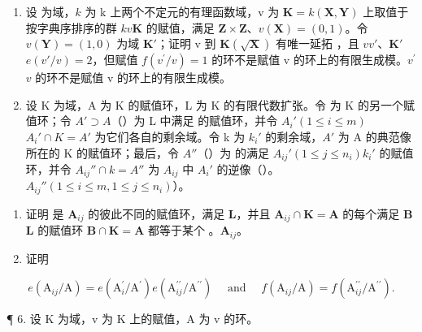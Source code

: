 \begin{enumerate}
\def\labelenumi{\arabic{enumi}.}
\setcounter{enumi}{3}
\item
  设  为域，\(k\) 为 k 上两个不定元的有理函数域，v 为 \(\mathbf{K} = k(\mathbf{X}, \mathbf{Y})\) 上取值于按字典序排序的群 \(k\)\(v\)\(\mathbf{K}\) 的赋值，满足 \(\mathbf{Z} \times \mathbf{Z}\)、\(v(\mathbf{X}) = (0, 1)\)。令 \(v(\mathbf{Y}) = (1, 0)\) 为域 \(\mathbf{K}'\)；证明 v 到 \(\mathbf{K}(\sqrt{\mathbf{X}})\) 有唯一延拓 ，且 \(v\)\(v'\)、\(\mathbf{K}'\)\(e(v'/v) = 2\)，但赋值 \(f(v^{\prime}/v)=1\) 的环不是赋值 v 的环上的有限生成模。\(v^{\prime}\)\(v\) 的环不是赋值 v 的环上的有限生成模。
\item
  设 K 为域，A 为 K 的赋值环，L 为 K 的有限代数扩张。令  为 K 的另一个赋值环；令 \(A' \supset A\)（）为 L 中满足  的赋值环，并令 \(A_i' (1 \leqslant i \leqslant m)\)\(A_i' \cap K = A'\) 为它们各自的剩余域。令 k 为 \(k_i'\) 的剩余域，\(A'\) 为 A 的典范像所在的 K 的赋值环；最后，令 \(A''\)（）为  的满足 \(A_{ij}' (1 \leqslant j \leqslant n_i)\)\(k_i'\) 的赋值环，并令 \(A_{ij}'' \cap k = A''\) 为 \(A_{ij}\) 中 \(A_i'\) 的逆像（）。\(A_{ij}'' (1 \leqslant i \leqslant m, 1 \leqslant j \leqslant n_i)\)）。
\end{enumerate}

\begin{enumerate}
\def\labelenumi{(\alph{enumi})}
\item
  证明  是 \(\mathbf{A}_{ij}\) 的彼此不同的赋值环，满足 \(\mathbf{L}\)，并且 \(\mathbf{A}_{ij} \cap \mathbf{K} = \mathbf{A}\) 的每个满足 \(\mathbf{B}\)\(\mathbf{L}\) 的赋值环 \(\mathbf{B} \cap \mathbf{K} = \mathbf{A}\) 都等于某个 。\(\mathbf{A}_{ij}\)。
\item
  证明
\end{enumerate}

\[
e \left(\mathrm{A} _ {i j} / \mathrm{A}\right) = e \left(\mathrm{A} _ {i} ^ {\prime} / \mathrm{A} ^ {\prime}\right) e \left(\mathrm{A} _ {i j} ^ {\prime \prime} / \mathrm{A} ^ {\prime \prime}\right) \quad \text { and } \quad f \left(\mathrm{A} _ {i j} / \mathrm{A}\right) = f \left(\mathrm{A} _ {i j} ^ {\prime \prime} / \mathrm{A} ^ {\prime \prime}\right).
\]

¶ 6. 设 K 为域，v 为 K 上的赋值，A 为 v 的环。

